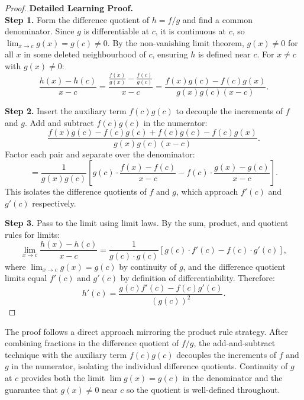 \begin{proof}
\textbf{Detailed Learning Proof.}~\\

\textbf{Step 1.} Form the difference quotient of $h = f/g$ and find a common denominator. Since $g$ is differentiable at $c$, it is continuous at $c$, so $\lim_{x \to c} g(x) = g(c) \neq 0$. By the non-vanishing limit theorem, $g(x) \neq 0$ for all $x$ in some deleted neighbourhood of $c$, ensuring $h$ is defined near $c$. For $x \neq c$ with $g(x) \neq 0$:
\[
  \frac{h(x) - h(c)}{x - c}
  = \frac{\frac{f(x)}{g(x)} - \frac{f(c)}{g(c)}}{x - c}
  = \frac{f(x)g(c) - f(c)g(x)}{g(x)g(c)(x - c)}.
\]

\textbf{Step 2.} Insert the auxiliary term $f(c)g(c)$ to decouple the increments of $f$ and $g$. Add and subtract $f(c)g(c)$ in the numerator:
\[
  \frac{f(x)g(c) - f(c)g(c) + f(c)g(c) - f(c)g(x)}{g(x)g(c)(x - c)}.
\]
Factor each pair and separate over the denominator:
\[
  = \frac{1}{g(x)g(c)}
    \left[
      g(c) \cdot \frac{f(x) - f(c)}{x - c}
      - f(c) \cdot \frac{g(x) - g(c)}{x - c}
    \right].
\]
This isolates the difference quotients of $f$ and $g$, which approach $f'(c)$ and $g'(c)$ respectively.

\textbf{Step 3.} Pass to the limit using limit laws. By the sum, product, and quotient rules for limits:
\[
  \lim_{x \to c} \frac{h(x) - h(c)}{x - c}
  = \frac{1}{g(c) \cdot g(c)}
    \left[
      g(c) \cdot f'(c) - f(c) \cdot g'(c)
    \right],
\]
where $\lim_{x \to c} g(x) = g(c)$ by continuity of $g$, and the difference quotient limits equal $f'(c)$ and $g'(c)$ by definition of differentiability. Therefore:
\[
  h'(c) = \frac{g(c)f'(c) - f(c)g'(c)}{(g(c))^2}.
\]
\end{proof}

\begin{remark*}
The proof follows a direct approach mirroring the product rule strategy. After combining fractions in the difference quotient of $f/g$, the add-and-subtract technique with the auxiliary term $f(c)g(c)$ decouples the increments of $f$ and $g$ in the numerator, isolating the individual difference quotients. Continuity of $g$ at $c$ provides both the limit $\lim g(x) = g(c)$ in the denominator and the guarantee that $g(x) \neq 0$ near $c$ so the quotient is well-defined throughout.
\end{remark*}

